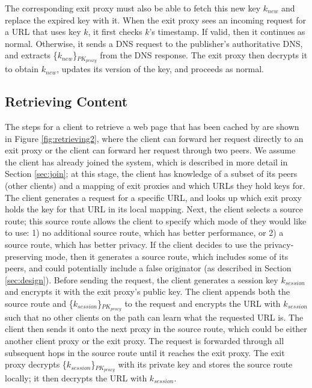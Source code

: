 The corresponding exit proxy must also be able to fetch this new key $k_{new}$ and replace the expired key with it.  When the exit proxy 
sees an incoming request for a URL that uses key $k$, it first checks $k$'s timestamp.  If valid, then it continues as normal.  Otherwise, 
it sends a DNS request to the publisher's authoritative DNS, and extracts \{$k_
{new}$\}$_{PK_{proxy}}$ from the DNS response.  The exit 
proxy then decrypts it to obtain $k_{new}$, updates its version of the key, and
proceeds as normal.

\subsection{Retrieving Content}
\label{sec:retrieve}
The steps for a client to retrieve a web page that has been cached by \system{} are shown in Figure \ref{fig:retrieving2}, where the client 
can forward her request directly to an exit proxy or the client can forward her
request through two peers. We assume the client has already joined the system, which is described in more detail in Section \ref{sec:join}; at this 
stage, the client has knowledge of a subset of its peers (other \system{} clients) and a mapping of exit proxies and which URLs they hold 
keys for.  The client generates a request for a specific URL, and looks up which exit proxy holds the key for that URL in its local mapping.  Next, 
the client selects a source route; this source route allows the client to specify which mode of \system{} they would like to use: 1) no additional source 
route, which has better performance, or 2) a source route, which has better privacy.  If the client decides to use the privacy-preserving mode, 
then it generates a source route, which includes some of its peers, and could potentially
include a false originator (as described in Section \ref{sec:design}).
Before sending the request, the client generates a session key $k_{session}$ and encrypts it with the exit proxy's public key.  The client appends both the source route and \{$k_{session}$\}$_{PK_{proxy}}$ to the request and encrypts the URL with $k_{session}$ such that no other clients on the path can learn what the requested URL is.  The client then sends it onto the next proxy in the source route, which could be either another client proxy or the exit proxy.  The request is forwarded 
through all subsequent hops in the source route until it reaches the exit proxy.  The exit proxy decrypts \{$k_{session}$\}$_{PK_{proxy}}$ with its private key and stores 
the source route locally; it then decrypts the URL with $k_{session}$. 

